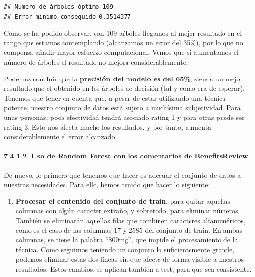 \documentclass[spanish,]{article}
\providecommand{\tightlist}{%
  \setlength{\itemsep}{0pt}\setlength{\parskip}{0pt}}
\let\oldparagraph\paragraph
\renewcommand{\paragraph}[1]{\oldparagraph{#1}\mbox{}}
\begin{document}
\begin{verbatim}
## Numero de árboles óptimo 109 
## Error minimo conseguido 0.3514377
\end{verbatim}

Como se ha podido observar, con 109 aŕboles llegamos al mejor resultado
en el rango que estamos contemplando (alcanzamos un error del 35\%), por
lo que no compensa añadir mayor esfuerzo computacional. Vemos que si
aumentamos el número de árboles el resultado no mejora
considerablemente.

Podemos concluir que la \textbf{precisión del modelo es del 65\%},
siendo un mejor resultado que el obtenido en los árboles de decisión
(tal y como era de esperar). Tenemos que tener en cuenta que, a pesar de
estar utilizando una técnica potente, nuestro conjunto de datos está
sujeto a muchísima subjetividad. Para unas personas, poca efectividad
tendrá asociado rating 1 y para otras puede ser rating 3. Esto nos
afecta mucho los resultados, y por tanto, aumenta considerablemente el
error alcanzado.

\paragraph{7.4.1.2. Uso de Random Forest con los comentarios de
BenefitsReview}\label{uso-de-random-forest-con-los-comentarios-de-benefitsreview}

De nuevo, lo primero que tenemos que hacer es adecuar el conjunto de
datos a nuestras necesidades. Para ello, hemos tenido que hacer lo
siguiente:

\begin{enumerate}
\def\labelenumi{\arabic{enumi}.}
\tightlist
\item
  \textbf{Procesar el contenido del conjunto de train}, para quitar
  aquellas columnas con algún caracter extraño, y sobretodo, para
  eliminar números. También se eliminarán aquellas filas que combinen
  caracteres alfanuméricos, como es el caso de las columnas 17 y 2585
  del conjunto de train. En ambas columnas, se tiene la palabra
  ``800mg'', que impide el procesamiento de la técnica. Como seguimos
  teniendo un conjunto lo suficientemente grande, podemos eliminar estas
  dos líneas sin que afecte de forma visible a nuestros resultados.
  Estos cambios, se aplican también a test, para que sea consistente.
\end{enumerate}
\end{document}
